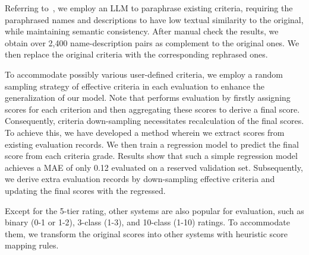 Referring to~\cite{Ovadia2023FTorRAG}, we employ an LLM to paraphrase existing criteria, requiring the paraphrased names and descriptions to have low textual similarity to the original, while maintaining semantic consistency. After manual check the results, we obtain over 2,400 name-description pairs as complement to the original ones. We then replace the original criteria with the corresponding rephrased ones.

To accommodate possibly various user-defined criteria, we employ a random sampling strategy of  effective criteria in each evaluation to enhance the generalization of our model. Note that \modelname performs evaluation by firstly assigning scores for each criterion and then aggregating these scores to derive a final score. Consequently, criteria down-sampling necessitates recalculation of the final scores.
% 
To achieve this, we have developed a method wherein we extract scores from existing evaluation records. We then train a regression model to predict the final score from each criteria grade. Results show that such a simple regression model achieves a MAE of only 0.12 evaluated on a reserved validation set. %
Subsequently, we derive extra evaluation records by down-sampling effective criteria and updating the final scores with the regressed.

Except for the 5-tier rating, other systems are also popular for evaluation, such as binary (0-1 or 1-2), 3-class (1-3), and 10-class (1-10) ratings. To accommodate them, we transform the original scores into other systems with heuristic score mapping rules.


